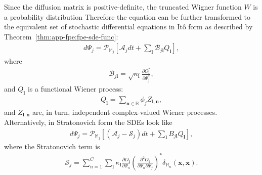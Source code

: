 \documentclass[12pt,aip,jmp,amssymb,amsmath]{revtex4-1}
\begin{document}
Since the diffusion matrix is positive-definite, the truncated Wigner function $W$ is a probability distribution
Therefore the equation can be further transformed to the equivalent set of stochastic differential equations in It\^{o} form as described by Theorem~\ref{thm:app-fpe:fpe-sde-func}:
\begin{equation}\label{eqn:fpe:sdes}\begin{split}
    d\Psi_j = \mathcal{P}_{\mathbb{M}_j} \left[
        \mathcal{A}_j dt + \sum_{\boldsymbol{l}} \mathcal{B}_{j \boldsymbol{l}} Q_{\boldsymbol{l}}
    \right],
\end{split}\end{equation}
where
\begin{equation}\begin{split}
    \mathcal{B}_{j \boldsymbol{l}} = \sqrt{\kappa_{\boldsymbol{l}}} \frac{\partial O_{\boldsymbol{l}}^*}{\partial \Psi_j^*},
\end{split}\end{equation}
and $Q_{\boldsymbol{l}}$ is a functional Wiener process:
\begin{equation}\begin{split}
    Q_{\boldsymbol{l}} = \sum_{\boldsymbol{n} \in \mathbb{B}} \phi_j Z_{\boldsymbol{l},\boldsymbol{n}},
\end{split}\end{equation}
and $Z_{\boldsymbol{l},\boldsymbol{n}}$ are, in turn, independent complex-valued Wiener processes.
Alternatively, in Stratonovich form the SDEs look like
\begin{equation}\begin{split}
    d\Psi_j = \mathcal{P}_{\mathbb{M}_j} \left[
        (\mathcal{A}_j - \mathcal{S}_j) dt + \sum_{\boldsymbol{l}} B_{j \boldsymbol{l}} Q_{\boldsymbol{l}}
    \right],
\end{split}\end{equation}
where the Stratonovich term is
\begin{equation}\begin{split}
    \mathcal{S}_j
    = \sum_{n=1}^C \sum_{\boldsymbol{l}} \kappa_{\boldsymbol{l}}
        \frac{\partial O_{\boldsymbol{l}}}{\partial \Psi_n}
        \left(\frac{\partial^2 O_{\boldsymbol{l}}}{\partial \Psi_n \partial \Psi_j} \right)^*
        \delta_{\mathbb{M}_n} (\boldsymbol{x}, \boldsymbol{x}).
\end{split}\end{equation}
\end{document}
